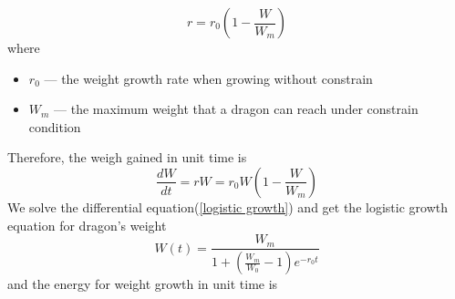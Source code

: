 \documentclass{mcmthesis}
\newcommand{\upcite}[1]{\textsuperscript{\textsuperscript{\cite{#1}}}}
\begin{document}
\begin{equation}
r=r_0(1-\frac{W}{W_m})
\end{equation}
where\begin{itemize}
\item $r_0$ --- the weight growth rate when growing without constrain
\item $W_m$ --- the maximum weight that a dragon can reach under constrain condition
\end{itemize}
Therefore, the weigh gained in unit time is
\begin{equation}
\label{logistic growth}
\frac{dW}{dt}=rW=r_0W(1-\frac{W}{W_m})
\end{equation}
We solve the differential equation(\ref{logistic growth}) and get the logistic growth equation for dragon's weight
\begin{equation}
W(t)=\frac{W_m}{1+(\frac{W_m}{W_0}-1)e^{-r_0t}}
\end{equation}
and the energy for weight growth in unit time is
\end{document}
